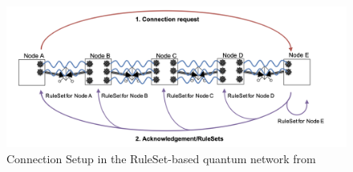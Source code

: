 \begin{figure}[H]
  \centerline{\includegraphics[width=.5\columnwidth]{images/ruleset_connection.png}}
  \caption{Connection Setup in the RuleSet-based quantum network from \cite{matsuo2019simulation}}
\end{figure}



